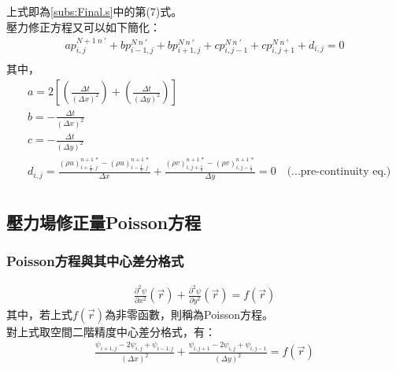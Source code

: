 \documentclass[12pt]{article}
\begin{document}
\noindent 上式即為\eqref{subs:Final.s}中的第(7)式。\\
壓力修正方程又可以如下簡化：
\begin{equation}\begin{split}
    ap_{i,j}^{N+1\ n\ \prime} + bp_{i-1,j}^{N\ n\ \prime} + bp_{i+1,j}^{N\ n\ \prime} + cp_{i,j-1}^{N\ n\ \prime} + cp_{i,j+1}^{N\ n\ \prime} + d_{i,j} = 0 \\[1.5ex]
\end{split}\end{equation}
\noindent 其中，\\
\begin{equation}\begin{split}
    &a = 2\left[(\frac{\Delta t}{(\Delta x)^{2}})+(\frac{\Delta t}{(\Delta y)^{2}})\right]\\
    &b = -\frac{\Delta t}{(\Delta x)^{2}}\\
    &c = -\frac{\Delta t}{(\Delta y)^{2}}\\
    &d_{i,j} = \frac{(\rho u)_{i+\frac{1}{2},j}^{n+1\ *} - (\rho u)_{i-\frac{1}{2},j}^{n+1\ *}}{\Delta x} + \frac{(\rho v)_{i,j+\frac{1}{2}}^{n+1\ *} - (\rho v)_{i,j-\frac{1}{2}}^{n+1\ *}}{\Delta y} = 0 \quad \text{(...pre-continuity eq.)}\\[1.5ex]
\end{split}\end{equation}
\subsection{壓力場修正量Poisson方程}
\subsubsection{Poisson方程與其中心差分格式}
\begin{equation}\begin{split}
\frac{\partial^{2} \psi}{\partial x^{2}} (\vec{r}) +\frac{\partial^{2} \psi}{\partial y^{2}} (\vec{r}) = f(\vec{r})
\end{split}\end{equation}
\noindent 其中，若上式$f(\vec{r})$為非零函數，則稱為Poisson方程。\\
對上式取空間二階精度中心差分格式，有：
\begin{equation}\label{eq:poisson}\begin{split}
    \frac{\psi_{i+1,j}- 2\psi_{i,j} + \psi_{i-1,j}}{(\Delta x)^{2}} + \frac{\psi_{i,j+1} - 2\psi_{i,j} + \psi_{i,j-1}}{(\Delta y)^{2}} = f({\vec{r}})\\
\end{split}\end{equation}
\end{document}
